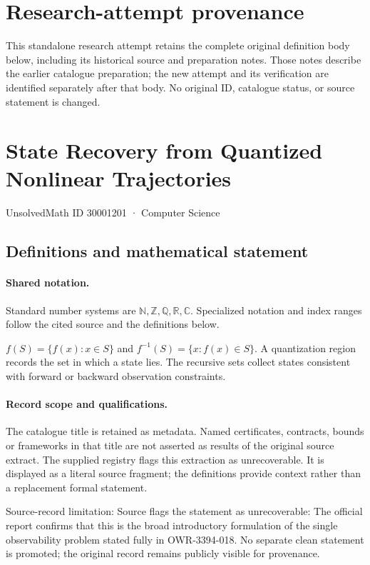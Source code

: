 \documentclass[11pt]{article}
\begin{document}
\section*{Research-attempt provenance}
This standalone research attempt retains the complete original definition body below,
including its historical source and preparation notes. Those notes describe the
earlier catalogue preparation; the new attempt and its verification are identified
separately after that body. No original ID, catalogue status, or source statement is changed.

\section{State Recovery from Quantized Nonlinear Trajectories}\label{30001201}
{\small UnsolvedMath ID 30001201 · Computer Science}
\subsection{Definitions and mathematical statement}

\paragraph{Shared notation.}Standard number systems are $\mathbb N,\mathbb Z,\mathbb Q,\mathbb R,\mathbb C$. Specialized notation and index ranges follow the cited source and the definitions below.


$f(S)=\{f(x):x\in S\}$ and $f^{-1}(S)=\{x:f(x)\in S\}$. A quantization region records the set in which a state lies. The recursive sets collect states consistent with forward or backward observation constraints.
\paragraph{Record scope and qualifications.}
The catalogue title is retained as metadata. Named certificates, contracts, bounds or frameworks in that title are not asserted as results of the original source extract.
The supplied registry flags this extraction as unrecoverable. It is displayed as a literal source fragment; the definitions provide context rather than a replacement formal statement.

Source-record limitation: Source flags the statement as unrecoverable: The official report confirms that this is the broad introductory formulation of the single observability problem stated fully in OWR-3394-018. No separate clean statement is promoted; the original record remains publicly visible for provenance.
\end{document}
